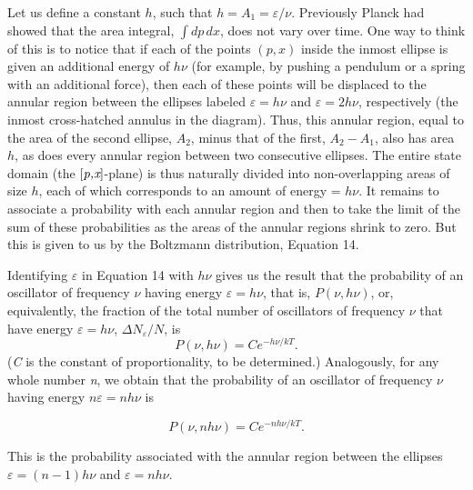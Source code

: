 %
Let us define a constant $h$, such that $h = A_1 = \varepsilon/\nu$. Previously Planck had showed that the area integral,
$\int\! dp\, dx$, does not vary over time. One way to think of this is to
notice that if each of the points $(p,x)$ inside the inmost ellipse
is given an additional energy of $h\nu$ (for example, by pushing a
pendulum or a spring with an additional force), then each of these
points will be displaced to the annular region between the ellipses
labeled $\varepsilon = h\nu$ and $\varepsilon = 2h\nu$, respectively (the inmost
cross-hatched annulus in the diagram). Thus, this annular region, equal
to the area of the second ellipse, $A_2$, minus that
of the first, $A_2 - A_1$,
also has area $h$, as does every annular region between two
consecutive ellipses. The entire state domain (the
${[}\emph{p,x}{]}$-plane) is thus naturally divided into non-overlapping
areas of size $h$, each of which corresponds to an amount of energy
= $h\nu$. It remains to associate a probability with each annular
region and then to take the limit of the sum of these probabilities as
the areas of the annular regions shrink to zero. But this is given to us
by the Boltzmann distribution, Equation 14.

Identifying $\varepsilon$ in Equation 14 with $h\nu$ gives us the result
that the probability of an oscillator of frequency $\nu$ having
energy $\varepsilon = h\nu$, that is, $P(\nu, h\nu)$, or, equivalently, the
fraction of the total number of oscillators of frequency $\nu$ that
have energy $\varepsilon = h\nu$, $\Delta N_\varepsilon/N$,
is
%
\begin{equation*}
P(\nu, h\nu) = Ce^{-h\nu/kT}.
\end{equation*}
%
(\emph{C} is the constant of proportionality, to be determined.)
Analogously, for any whole number \emph{n}, we obtain that the
probability of an oscillator of frequency $\nu$ having energy
$n\varepsilon = nh\nu$ is

\begin{equation}
P(\nu, nh\nu) = Ce^{-nh\nu/kT}. %
\end{equation}

This is the probability associated with the annular region between the
ellipses $\varepsilon = (n-1)h\nu$ and $\varepsilon = nh\nu$.

